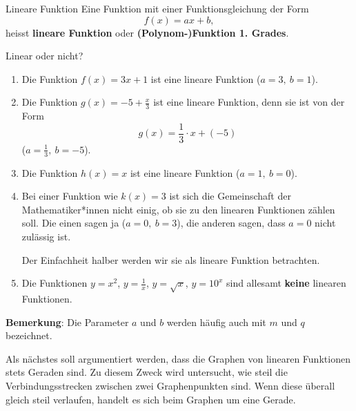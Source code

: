 \begin{definition}
    {Lineare Funktion}{}
    Eine Funktion mit einer Funktionsgleichung der Form
    \[
        f(x)=ax+b,
    \]
    heisst \textbf{lineare Funktion} oder
    \textbf{(Polynom-)Funktion 1. Grades}.
\end{definition}
\begin{bsp}
    {Linear oder nicht?}{}
    \begin{enumerate}
        \item Die Funktion \(f(x)=3x+1\) ist eine lineare Funktion
              (\(a=3,\ b=1\)).

        \item Die Funktion \(g(x)=-5+\frac{x}{3}\) ist eine lineare
              Funktion, denn sie ist von der Form
              \[
                  g(x)=\frac{1}{3}\cdot x+(-5)
              \]
              (\(a=\frac{1}{3},\ b=-5\)).

        \item Die Funktion \(h(x)=x\) ist eine lineare Funktion
              (\(a=1,\ b=0\)).

        \item Bei einer Funktion wie \(k(x)=3\) ist sich die
              Gemeinschaft der Mathematiker*innen nicht einig, ob sie
              zu den linearen Funktionen zählen soll. Die einen sagen ja
              (\(a=0,\ b=3\)), die anderen sagen, dass \(a=0\) nicht
              zulässig ist.

              Der Einfachheit halber werden wir sie als lineare Funktion
              betrachten.

        \item Die Funktionen \(y=x^2\), \(y=\frac{1}{x}\),
              \(y=\sqrt{x}\), \(y=10^x\) sind allesamt
              \textbf{keine} linearen Funktionen.
    \end{enumerate}
\end{bsp}

\textbf{Bemerkung}: Die Parameter \(a\) und \(b\) werden häufig auch mit \(m\) und \(q\) bezeichnet.

Als nächstes soll argumentiert werden, dass die Graphen von
linearen Funktionen stets Geraden sind. Zu diesem Zweck wird
untersucht, wie steil die Verbindungsstrecken zwischen zwei
Graphenpunkten sind. Wenn diese überall gleich steil verlaufen,
handelt es sich beim Graphen um eine Gerade.

